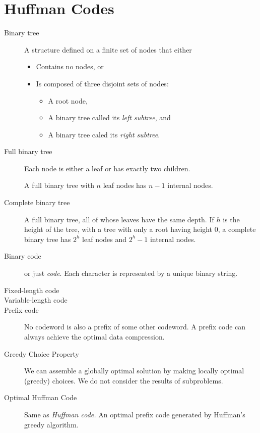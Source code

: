 \section{Huffman Codes}

\begin{description}
	\item [Binary tree] A structure defined on a finite set of nodes that either
	
	\begin{itemize}
		\item Contains no nodes, or
		\item Is composed of three disjoint sets of nodes:
		\begin{itemize}
			\item A root node,
			\item A binary tree called its {\it left subtree}, and 
			\item A binary tree caled its {\it right subtree}.
		\end{itemize}
	\end{itemize}
	
	\item [Full binary tree] Each node is either a leaf or has exactly two children.  
	
	A full binary tree with $n$ leaf nodes has $n-1$ internal nodes.  
	
	\item [Complete binary tree] A full binary tree, all of whose leaves have the same depth.  If $h$ is the height of the tree, with a tree with only a root having height 0, a complete binary tree has $2^h$ leaf nodes and $2^h-1$ internal nodes.  
	\item [Binary code] or just {\it code}.  Each character is represented by a unique binary string.
	\item [Fixed-length code]
	\item [Variable-length code] 
	\item [Prefix code] No codeword is also a prefix of some other codeword.  A prefix code can always achieve the optimal data compression.
	\item [Greedy Choice Property] We can assemble a globally optimal solution by making locally optimal (greedy) choices.  We do not consider the results of subproblems.  
	\item [Optimal Huffman Code] Same as {\it Huffman code.}  An optimal prefix code generated by Huffman's greedy algorithm.
\end{description}

